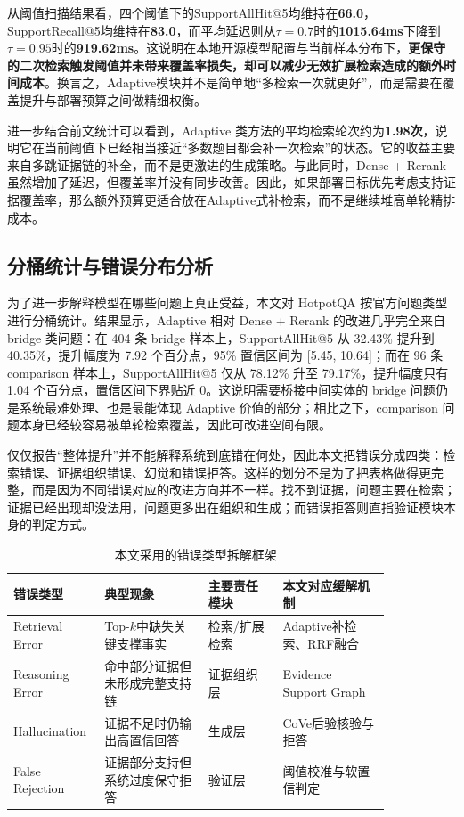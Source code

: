 从阈值扫描结果看，四个阈值下的SupportAllHit@5均维持在\textbf{66.0}，SupportRecall@5均维持在\textbf{83.0}，而平均延迟则从$\tau=0.7$时的\textbf{1015.64ms}下降到$\tau=0.95$时的\textbf{919.62ms}。这说明在本地开源模型配置与当前样本分布下，\textbf{更保守的二次检索触发阈值并未带来覆盖率损失，却可以减少无效扩展检索造成的额外时间成本}。换言之，Adaptive模块并不是简单地“多检索一次就更好”，而是需要在覆盖提升与部署预算之间做精细权衡。

进一步结合前文统计可以看到，Adaptive 类方法的平均检索轮次约为\textbf{1.98次}，说明它在当前阈值下已经相当接近“多数题目都会补一次检索”的状态。它的收益主要来自多跳证据链的补全，而不是更激进的生成策略。与此同时，Dense + Rerank 虽然增加了延迟，但覆盖率并没有同步改善。因此，如果部署目标优先考虑支持证据覆盖率，那么额外预算更适合放在Adaptive式补检索，而不是继续堆高单轮精排成本。

\subsection{分桶统计与错误分布分析}

为了进一步解释模型在哪些问题上真正受益，本文对 HotpotQA 按官方问题类型进行分桶统计。结果显示，Adaptive 相对 Dense + Rerank 的改进几乎完全来自 bridge 类问题：在 404 条 bridge 样本上，SupportAllHit@5 从 32.43\% 提升到 40.35\%，提升幅度为 7.92 个百分点，95\% 置信区间为 [5.45, 10.64]；而在 96 条 comparison 样本上，SupportAllHit@5 仅从 78.12\% 升至 79.17\%，提升幅度只有 1.04 个百分点，置信区间下界贴近 0。这说明需要桥接中间实体的 bridge 问题仍是系统最难处理、也是最能体现 Adaptive 价值的部分；相比之下，comparison 问题本身已经较容易被单轮检索覆盖，因此可改进空间有限。

仅仅报告“整体提升”并不能解释系统到底错在何处，因此本文把错误分成四类：检索错误、证据组织错误、幻觉和错误拒答。这样的划分不是为了把表格做得更完整，而是因为不同错误对应的改进方向并不一样。找不到证据，问题主要在检索；证据已经出现却没法用，问题更多出在组织和生成；而错误拒答则直指验证模块本身的判定方式。

\begin{table}[!htbp]
\centering
\caption{本文采用的错误类型拆解框架}
\label{tab:error_taxonomy}
\small
\begin{tabular}{|p{0.15\linewidth}|p{0.25\linewidth}|p{0.18\linewidth}|p{0.26\linewidth}|}
\hline
\textbf{错误类型} & \textbf{典型现象} & \textbf{主要责任模块} & \textbf{本文对应缓解机制} \\
\hline
Retrieval Error & Top-$k$中缺失关键支撑事实 & 检索/扩展检索 & Adaptive补检索、RRF融合 \\
\hline
Reasoning Error & 命中部分证据但未形成完整支持链 & 证据组织层 & Evidence Support Graph \\
\hline
Hallucination & 证据不足时仍输出高置信回答 & 生成层 & CoVe后验核验与拒答 \\
\hline
False Rejection & 证据部分支持但系统过度保守拒答 & 验证层 & 阈值校准与软置信判定 \\
\hline
\end{tabular}
\end{table}

